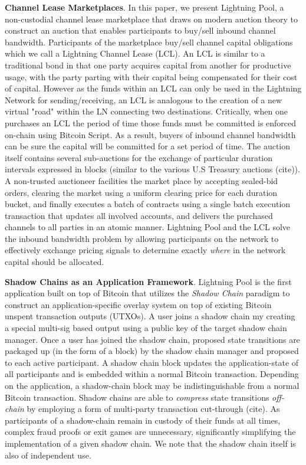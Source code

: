 \documentclass[12pt,a4paper]{article}
\theoremstyle{definition}
\begin{document}
\textbf{Channel Lease Marketplaces}. In this paper, we present Lightning Pool,
a non-custodial channel lease marketplace that draws on modern auction theory
to construct an auction that enables participants to buy/sell inbound channel
bandwidth. Participants of the marketplace buy/sell channel capital obligations
which we call a Lightning Channel Lease (LCL). An LCL is similar to a
traditional bond in that one party acquires capital from another for productive
usage, with the party parting with their capital being compensated for their
cost of capital. However as the funds within an LCL can only be used in the
Lightning Network for sending/receiving, an LCL is analogous to the creation of
a new virtual "road" within the LN connecting two destinations. Critically,
when one purchases an LCL the period of time those funds must be committed is
enforced on-chain using Bitcoin Script. As a result, buyers of inbound channel
bandwidth can be sure the capital will be committed for a set period of time.
The auction itself contains several sub-auctions for the exchange of particular
duration intervals expressed in blocks (similar to the various U.S Treasury
auctions (cite)). A non-trusted auctioneer facilities the market place by
accepting sealed-bid orders, clearing the market using a uniform clearing price
for each duration bucket, and finally executes a batch of contracts using a
single batch execution transaction that updates all involved accounts, and
delivers the purchased channels to all parties in an atomic manner. Lightning
Pool and the LCL solve the inbound bandwidth problem by allowing participants
on the network to effectively exchange pricing signals to determine exactly
\emph{where} in the network capital should be allocated.


\textbf{Shadow Chains as an Application Framework}. Lightning Pool is the first
application built on top of Bitcoin that utilizes the \emph{Shadow Chain}
paradigm to construct an application-specific overlay system on top of existing
Bitcoin unspent transaction outputs (UTXOs). A user joins a shadow chain my
creating a special multi-sig based output using a public key of the target
shadow chain manager. Once a user has joined the shadow chain, proposed state
transitions are packaged up (in the form of a block) by the shadow chain
manager and proposed to each active participant. A shadow chain block updates
the application-state of all participants and is embedded within a normal
Bitcoin transaction. Depending on the application, a shadow-chain block may be
indistinguishable from a normal Bitcoin transaction. Shadow chains are able to
\emph{compress} state transitions \emph{off-chain} by employing a form of
multi-party transaction cut-through (cite). As participants of a shadow-chain
remain in custody of their funds at all times, complex fraud proofs or exit
games are unnecessary, significantly simplifying the implementation of a given
shadow chain. We note that the shadow chain itself is also of independent use.
\end{document}
